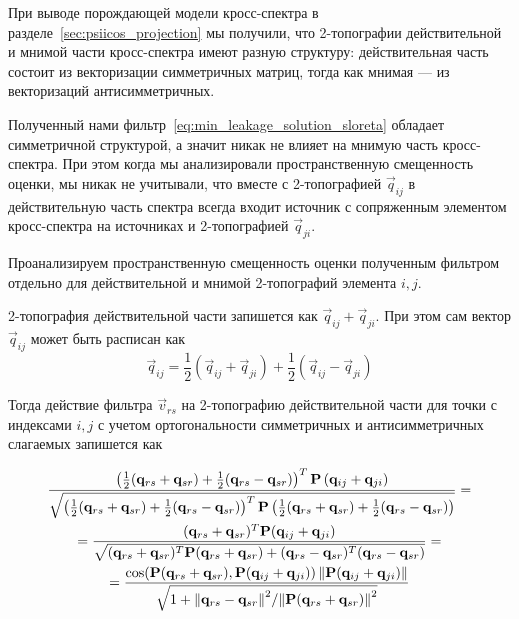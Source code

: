 При выводе порождающей модели кросс-спектра в разделе~\ref{sec:psiicos_projection}
мы получили, что 2-топографии действительной и
мнимой части кросс-спектра имеют разную структуру: действительная часть состоит
из векторизации симметричных матриц, тогда как мнимая --- из векторизаций
антисимметричных.

Полученный нами фильтр~\ref{eq:min_leakage_solution_sloreta} обладает симметричной
структурой, а значит никак не влияет на мнимую часть кросс-спектра. При этом
когда мы анализировали пространственную смещенность оценки, мы никак не учитывали, что
вместе с 2-топографией $\vec{q}_{ij}$ в действительную часть спектра всегда входит
источник с сопряженным элементом кросс-спектра на источниках и 2-топографией $\vec{q}_{ji}$.

Проанализируем пространственную смещенность оценки полученным фильтром отдельно
для действительной и мнимой 2-топографий элемента $i, j$.

2-топография действительной части запишется как $\vec{q}_{ij} + \vec{q}_{ji}$.
При этом сам вектор $\vec{q}_{ij}$ может быть расписан как
\begin{equation}
\vec{q}_{ij} = \frac{1}{2} (\vec{q}_{ij} + \vec{q}_{ji}) + \frac{1}{2} (\vec{q}_{ij} - \vec{q}_{ji})
\end{equation}

Тогда действие фильтра $\vec{v}_{rs}$ на 2-топографию действительной части для
точки с индексами $i, j$ с учетом ортогональности симметричных и
антисимметричных слагаемых запишется как

\begin{multline}
    \frac{\left(\frac{1}{2} (\mathbf{q}_{rs} + \mathbf{q}_{sr}) + \frac{1}{2} (\mathbf{q}_{rs} - \mathbf{q}_{sr})\right)^T\mathbf{P}\left(\mathbf{q}_{ij} + \mathbf{q}_{ji}\right)}
    {\sqrt{\left(\frac{1}{2} (\mathbf{q}_{rs} + \mathbf{q}_{sr}) + \frac{1}{2}
    (\mathbf{q}_{rs} - \mathbf{q}_{sr})\right)^T\mathbf{P}\left(\frac{1}{2} (\mathbf{q}_{rs}
    + \mathbf{q}_{sr}) + \frac{1}{2} (\mathbf{q}_{rs} - \mathbf{q}_{sr})\right)}}  =\\
    =\frac{(\mathbf{q}_{rs} + \mathbf{q}_{sr})^T \mathbf{P} (\mathbf{q}_{ij} + \mathbf{q}_{ji})}
    {\sqrt{(\mathbf{q}_{rs} + \mathbf{q}_{sr})^T\mathbf{P}(\mathbf{q}_{rs} + \mathbf{q}_{sr}) + (\mathbf{q}_{rs} - \mathbf{q}_{sr})^T(\mathbf{q}_{rs} - \mathbf{q}_{sr})}} =\\
    = \frac{\cos(\mathbf{P}(\mathbf{q}_{rs} + \mathbf{q}_{sr}), \mathbf{P}(\mathbf{q}_{ij} + \mathbf{q}_{ji})) \left\lVert\mathbf{P}(\mathbf{q}_{ij} + \mathbf{q}_{ji})\right\rVert}
    {\sqrt{1 + {\left\lVert\mathbf{q}_{rs} - \mathbf{q}_{sr}\right\rVert^2}/{\left\lVert\mathbf{P}(\mathbf{q}_{rs} + \mathbf{q}_{sr})\right\rVert^2}}}
\end{multline}

